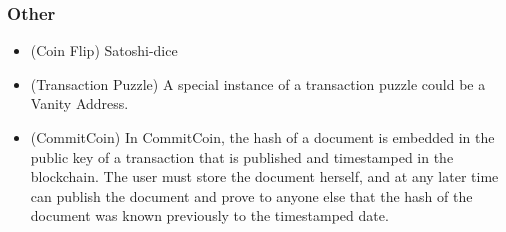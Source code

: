 \subsubsection{Other}
\begin{itemize}
\item (Coin Flip) Satoshi-dice
\item (Transaction Puzzle) A special instance of a transaction puzzle could be a Vanity Address.
\item (CommitCoin) In CommitCoin, the hash of a document is embedded in the public key of a transaction that is published and timestamped in the blockchain. The user must store the document herself, and at any later time can publish the document and prove to anyone else that the hash of the document was known previously to the timestamped date.
\end{itemize}

\newcommand{\riskpower}{K}
\newcommand{\overall}[1]{{~[ {#1} ]}}
\newcommand{\Oh}[1]{{#1}}

